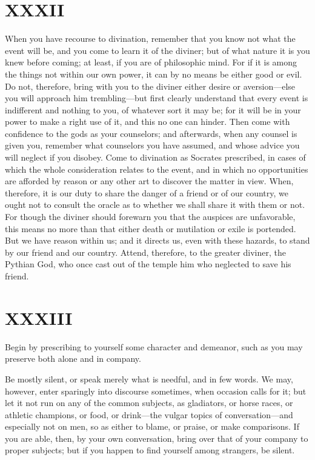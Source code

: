 \documentclass[11pt]{article}
\begin{document}
\section*{XXXII}

When you have recourse to divination, remember that you know not what the event will be, and you come to learn it of the diviner; but of what nature it is you knew before coming; at least, if you are of philosophic mind. For if it is among the things not within our own power, it can by no means be either good or evil. Do not, therefore, bring with you to the diviner either desire or aversion—else you will approach him trembling—but first clearly understand that every event is indifferent and nothing to you, of whatever sort it may be; for it will be in your power to make a right use of it, and this no one can hinder. Then come with confidence to the gods as your counselors; and afterwards, when any counsel is given you, remember what counselors you have assumed, and whose advice you will neglect if you disobey. Come to divination as Socrates prescribed, in cases of which the whole consideration relates to the event, and in which no opportunities are afforded by reason or any other art to discover the matter in view. When, therefore, it is our duty to share the danger of a friend or of our country, we ought not to consult the oracle as to whether we shall share it with them or not. For though the diviner should forewarn you that the auspices are unfavorable, this means no more than that either death or mutilation or exile is portended. But we have reason within us; and it directs us, even with these hazards, to stand by our friend and our country. Attend, therefore, to the greater diviner, the Pythian God, who once cast out of the temple him who neglected to save his friend.
\section*{XXXIII}

Begin by prescribing to yourself some character and demeanor, such as you may preserve both alone and in company.

Be mostly silent, or speak merely what is needful, and in few words. We may, however, enter sparingly into discourse sometimes, when occasion calls for it; but let it not run on any of the common subjects, as gladiators, or horse races, or athletic champions, or food, or drink—the vulgar topics of conversation—and especially not on men, so as either to blame, or praise, or make comparisons. If you are able, then, by your own conversation, bring over that of your company to proper subjects; but if you happen to find yourself among strangers, be silent.
\end{document}

